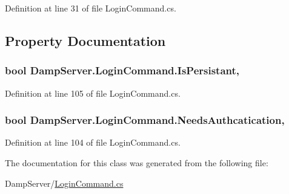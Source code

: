 Definition at line 31 of file Login\-Command.\-cs.



\subsection{Property Documentation}
\hypertarget{class_damp_server_1_1_login_command_a4f6a75ad495382ddfb727cb61c08020b}{
\subsubsection[{Is\-Persistant}]{\setlength{\rightskip}{0pt plus 5cm}bool Damp\-Server.\-Login\-Command.\-Is\-Persistant\hspace{0.3cm}{\ttfamily [get]}, {\ttfamily [set]}}}\label{class_damp_server_1_1_login_command_a4f6a75ad495382ddfb727cb61c08020b}


Definition at line 105 of file Login\-Command.\-cs.

\hypertarget{class_damp_server_1_1_login_command_ad3ddf0c5e9e9537a24d5c7255274c51f}{
\subsubsection[{Needs\-Authcatication}]{\setlength{\rightskip}{0pt plus 5cm}bool Damp\-Server.\-Login\-Command.\-Needs\-Authcatication\hspace{0.3cm}{\ttfamily [get]}, {\ttfamily [set]}}}\label{class_damp_server_1_1_login_command_ad3ddf0c5e9e9537a24d5c7255274c51f}


Definition at line 104 of file Login\-Command.\-cs.



The documentation for this class was generated from the following file\-:\begin{DoxyCompactItemize}
\item 
Damp\-Server/\hyperlink{_login_command_8cs}{Login\-Command.\-cs}\end{DoxyCompactItemize}
